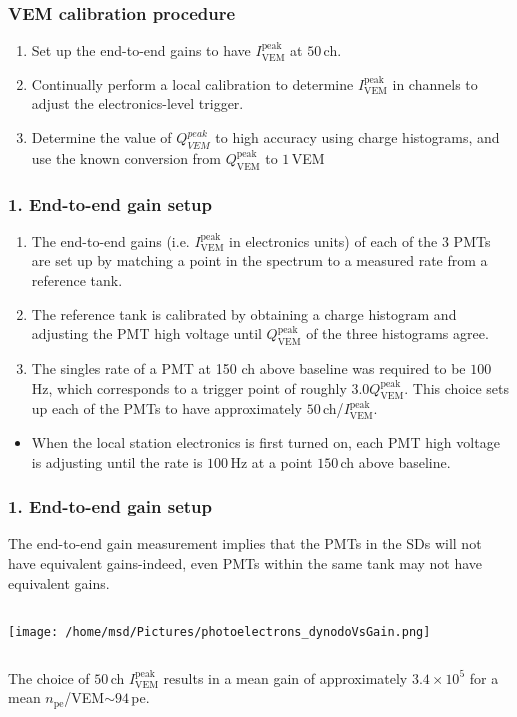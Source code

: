 \documentclass[aspectratio=169]{beamer}
\begin{document}
\begin{frame}
  \frametitle{VEM calibration procedure}
  \begin{enumerate}
    \item<2-> Set up the end-to-end gains to have
      $I^{\mathrm{peak}}_{\mathrm{VEM}}$ at $50$\,ch.
    \item<3-> Continually perform a local calibration to
      determine $I^{\mathrm{peak}}_{\mathrm{VEM}}$ in channels to
      adjust the electronics-level trigger.
    \item<4-> Determine the value of $Q^{peak}_{VEM}$ to high
      accuracy using charge histograms, and use the known
      conversion from $Q^{\mathrm{peak}}_{\mathrm{VEM}}$ to $1$\,VEM
  \end{enumerate}
\end{frame}

\begin{frame}
  \frametitle{1. End-to-end gain setup}
  \begin{enumerate}
    \item<1-> The end-to-end gains (i.e.
      $I^{\mathrm{peak}}_{\mathrm{VEM}}$ in electronics units) of
      each of the 3 PMTs are set up by matching a point in the
      spectrum to a measured rate from a reference tank.
    \item<2-> The reference tank is calibrated by obtaining a
      charge histogram and adjusting the PMT high voltage until
      $Q^{\mathrm{peak}}_{\mathrm{VEM}}$ of the three histograms
      agree.
    \item<3-> The singles rate of a PMT at 150 ch above baseline
      was required to be $100$\,Hz, which corresponds to a
      trigger point of roughly
      $3.0Q^{\mathrm{peak}}_{\mathrm{VEM}}$. This choice sets up
      each of the PMTs to have approximately
      $50$\,ch/$I^{\mathrm{peak}}_{\mathrm{VEM}}$.
  \end{enumerate}
  \begin{itemize}
    \item<4-> When the local station electronics is first turned
      on, each PMT high voltage is adjusting until the rate is
      $100$\,Hz at a point $150$\,ch above baseline.
  \end{itemize}
\end{frame}

\begin{frame}
  \frametitle{1. End-to-end gain setup}
  The end-to-end gain measurement implies that the PMTs in the
  SDs will not have equivalent gains-indeed, even PMTs within the
  same tank may not have equivalent gains.
  \vspace{0.5cm}
  \begin{columns}
    \begin{column}{.5\textwidth}
      \texttt{[image: /home/msd/Pictures/photoelectrons\_dynodoVsGain.png]}
    \end{column}
  \end{columns}
  The choice of $50$\,ch $I^{\mathrm{peak}}_{\mathrm{VEM}}$
  results in a mean gain of approximately $3.4\times10^5$ for a
  mean $n_{\mathrm{pe}}$/VEM$\sim94$\,pe.
\end{frame}
\end{document}
